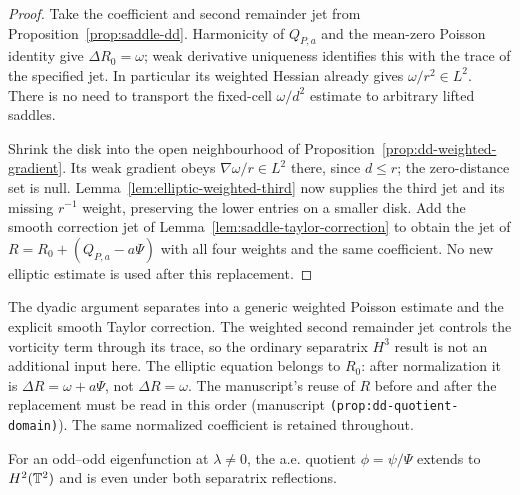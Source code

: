 \begin{proof}
\leanok
Take the coefficient and second remainder jet from
Proposition~\ref{prop:saddle-dd}. Harmonicity of $Q_{P,a}$ and the
mean-zero Poisson identity give $\Delta R_0=\omega$; weak derivative
uniqueness identifies this with the trace of the specified jet.
In particular its weighted Hessian already gives $\omega/r^2\in L^2$.
There is no need to transport the fixed-cell $\omega/d^2$ estimate
to arbitrary lifted saddles.

Shrink the disk into the open neighbourhood of
Proposition~\ref{prop:dd-weighted-gradient}. Its weak gradient obeys
$\nabla\omega/r\in L^2$ there, since $d\le r$; the zero-distance set
is null. Lemma~\ref{lem:elliptic-weighted-third} now supplies the
third jet and its missing $r^{-1}$ weight, preserving the lower
entries on a smaller disk.
Add the smooth correction jet of
Lemma~\ref{lem:saddle-taylor-correction} to obtain the jet of
$R=R_0+(Q_{P,a}-a\Psi)$ with all four weights and the same coefficient.
No new elliptic estimate is used after this replacement.
\end{proof}

\begin{remark}
The dyadic argument separates into a generic weighted Poisson estimate
and the explicit smooth Taylor correction. The weighted second remainder
jet controls the vorticity term through its trace, so the ordinary
separatrix $H^3$ result is not an additional input here.
The elliptic equation belongs to $R_0$: after normalization it is
$\Delta R=\omega+a\Psi$, not $\Delta R=\omega$.
The manuscript's reuse of $R$ before and after the replacement must be
read in this order (manuscript \texttt{(prop:dd-quotient-domain)}).
The same normalized coefficient is retained throughout.
\end{remark}

\begin{proposition}
\label{prop:dd-stream-quotient-h2}
\leanok
For an odd--odd eigenfunction at $\lambda\ne0$, the a.e. quotient
$\phi=\psi/\Psi$ extends to $H^2(\mathbb{T}^2)$ and is even under both
separatrix reflections.
\end{proposition}


